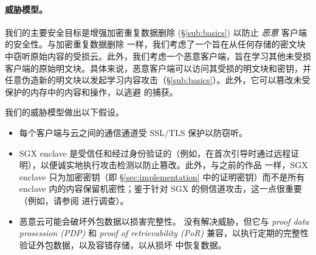 \paragraph{威胁模型。} 我们的主要安全目标是增强加密重复数据删除 (\S\ref{sub:basics}) 以防止 {\em 恶意} 客户端的安全性。与加密重复数据删除 \cite{bellare13a} 一样，我们考虑了一个旨在从任何存储的密文块中窃听原始内容的受损云。此外，我们考虑一个恶意客户端，旨在学习其他未受损客户端的原始明文块。具体来说，恶意客户端可以访问其受损的明文块和密钥，并任意伪造新的明文块以发起学习内容攻击（\S\ref{sub:basics}）。此外，它可以篡改未受保护的内存中的内容和操作，以逃避 \sysnameF 的捕获。

我们的威胁模型做出以下假设。
\begin{itemize}[leftmargin=*]
\item
  每个客户端与云之间的通信通道受 SSL/TLS 保护以防窃听。
\item
  SGX enclave 是受信任和经过身份验证的（例如，在首次引导时通过远程证明），以便诚实地执行攻击检测以防止篡改。此外，与之前的作品 \cite{shinde20, ren21} 一样，SGX enclave 只为加密密钥（即 \S\ref{sec:implementation} 中的证明密钥）而不是所有 enclave 内的内容保留机密性；鉴于针对 SGX 的侧信道攻击，这一点很重要（例如，请参阅 \cite{fei21} 进行调查）。
\item
  恶意云可能会破坏外包数据以损害完整性。 \sysnameF 没有解决威胁，但它与 {\em proof data prosession (PDP)} \cite{ateniese07} 和 {\em proof of retrievability (PoR)} \cite{juels07} 兼容，以执行定期的完整性验证外包数据，以及容错存储，以从损坏 \cite{li15} 中恢复数据。
\end{itemize}
